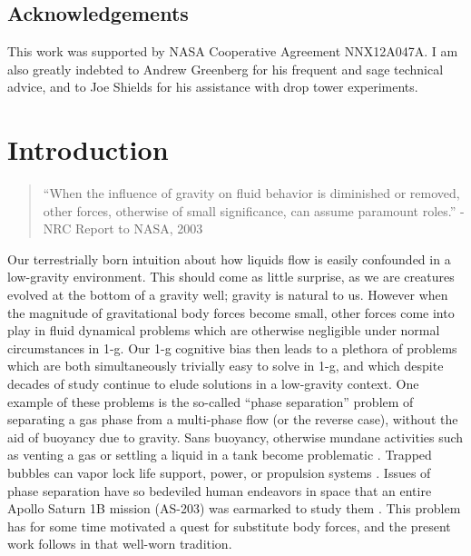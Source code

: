 \documentclass[12pt,a4paper,oneside]{book}
\newcommand\blankpage{%
    \null
    \thispagestyle{empty}%
    \addtocounter{page}{-1}%
    \newpage}
\begin{document}

\vspace*{\fill}
\section*{Acknowledgements}

This work was supported by NASA Cooperative Agreement NNX12A047A. I am also greatly indebted to Andrew Greenberg for his frequent and sage technical advice, and to Joe Shields for his assistance with drop tower experiments. \\ 
\vspace*{\fill}
\clearpage

\tableofcontents
\afterpage{\blankpage}
\listoffigures
\afterpage{\blankpage}

\mainmatter
\chapter{Introduction}
\begin{quote}
``When the influence of gravity on fluid behavior is diminished or removed, other forces, otherwise of small significance, can assume paramount roles.''
- NRC Report to NASA, 2003  \cite{motil_priorities_2012}
\end{quote}

Our terrestrially born intuition about how liquids flow is easily confounded in a low-gravity environment. This should come as little surprise, as we are creatures evolved at the bottom of a gravity well; gravity is natural to us. However when the magnitude of gravitational body forces become small, other forces come into play in fluid dynamical problems which are otherwise negligible under normal circumstances in 1-g. Our 1-g cognitive bias then leads to a plethora of problems which are both simultaneously trivially easy to solve in 1-g, and which despite decades of study continue to elude solutions in a low-gravity context. One example of these problems is the so-called ``phase separation'' problem of separating a gas phase from a multi-phase flow (or the reverse case), without the aid of buoyancy due to gravity. Sans buoyancy, otherwise mundane activities such as venting a gas or settling a liquid in a tank become problematic \cite{petrash_controlling_1964}. Trapped bubbles can vapor lock life support, power, or propulsion systems \cite{jenson_passive_2014}. Issues of phase separation have so bedeviled human endeavors in space that an entire Apollo Saturn 1B mission (AS-203) was earmarked to study them \cite{hastings_[saturn_1965}. This problem has for some time motivated a quest for substitute body forces, and the present work follows in that well-worn tradition.
\end{document}

